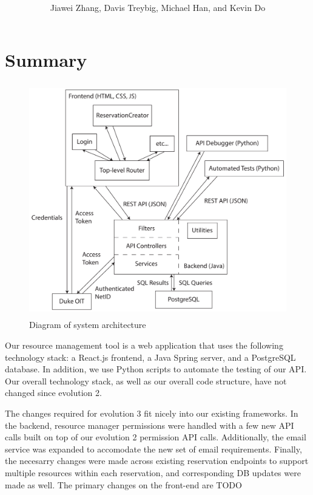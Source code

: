\documentclass[12pt]{article}
\title{\horrule{5pt}\\\vspace{0.4cm}{\bf \mytitle}\\}
\author{Jiawei Zhang, Davis Treybig, Michael Han, and Kevin Do}
\date{\horrule{1pt}}
\begin{document}
\maketitle{}
\section{Summary}
\begin{figure}[h]
\begin{center}
\includegraphics[height=4in]{../ev2/ev2_design_cropped.pdf}
\end{center}
\caption{Diagram of system architecture}
\label{fig:design}
\end{figure}

Our resource management tool is a web application that uses the following technology stack: a React.js frontend, a Java Spring server, and a PostgreSQL database. In addition, we use Python scripts to automate the testing of our API. Our overall technology stack, as well as our overall code structure, have not changed since evolution 2. 

The changes required for evolution 3 fit nicely into our existing frameworks. In the backend, resource manager permissions were handled with a few new API calls built on top of our evolution 2 permission API calls. Additionally, the email service was expanded to accomodate the new set of email requirements. Finally, the necesarry changes were made across existing reservation endpoints to support multiple resources within each reservation, and corresponding DB updates were made as well. The primary changes on the front-end are {\huge TODO}
\end{document}
